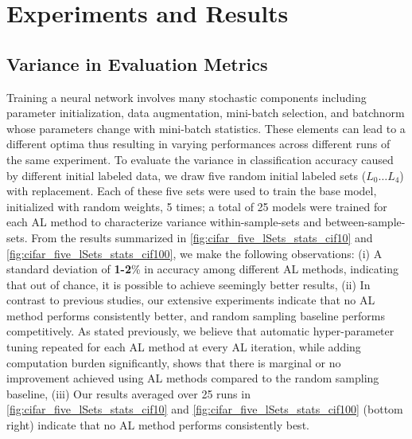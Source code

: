 \documentclass[10pt,twocolumn,letterpaper]{article}
\begin{document}
\section{Experiments and Results}

\subsection{Variance in Evaluation Metrics}
Training a neural network involves many stochastic components including parameter initialization, data augmentation, mini-batch selection, and batchnorm whose parameters change with mini-batch statistics. These elements can lead to a different optima thus resulting in varying performances across different runs of the same experiment. 
To evaluate the variance in classification accuracy caused by different initial labeled data, we draw five random initial labeled sets ($L_{0}\dots L_{4}$) with replacement. Each of these five sets were used to train the base model, initialized with random weights, 5 times; a total of 25 models were trained for each AL method to characterize variance within-sample-sets and between-sample-sets. From the results summarized in \cref{fig:cifar_five_lSets_stats_cif10} and \cref{fig:cifar_five_lSets_stats_cif100}, we make the following observations: (i) A standard deviation of \textbf{1-2}\% in accuracy among different AL methods, indicating that out of chance, it is possible to achieve seemingly better results, (ii) In contrast to previous studies, our extensive experiments indicate that no AL method performs consistently better, and random sampling baseline performs competitively. As stated previously, we believe that automatic hyper-parameter tuning repeated for each AL method at every AL iteration, while adding computation burden significantly, shows that there is marginal or no improvement achieved using AL methods compared to the random sampling baseline, (iii) Our results averaged over 25 runs in \cref{fig:cifar_five_lSets_stats_cif10} and \cref{fig:cifar_five_lSets_stats_cif100} (bottom right) indicate that no AL method performs consistently best.
\end{document}
